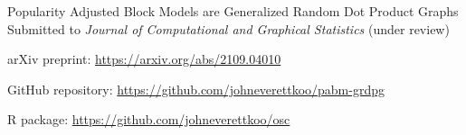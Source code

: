 \documentclass[
  ignorenonframetext,
]{beamer}
\begin{document}
\begin{frame}{Popularity Adjusted Block Models are Generalized Random
Dot Product Graphs}
\protect\hypertarget{popularity-adjusted-block-models-are-generalized-random-dot-product-graphs}{}
Submitted to \emph{Journal of Computational and Graphical Statistics}
(under review)

arXiv preprint: \url{https://arxiv.org/abs/2109.04010}

GitHub repository: \url{https://github.com/johneverettkoo/pabm-grdpg}

R package: \url{https://github.com/johneverettkoo/osc}
\end{frame}
\end{document}
